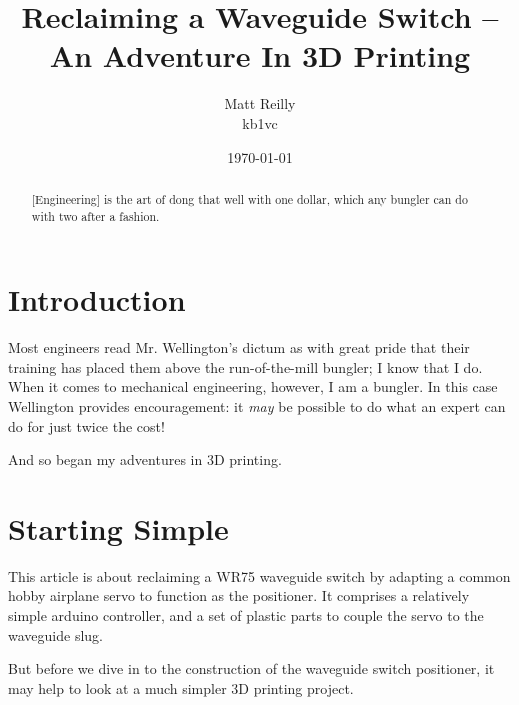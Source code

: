 \documentclass[12pt, twocolumn]{article}
\title{Reclaiming a Waveguide Switch -- An Adventure In 3D Printing}
\author{Matt Reilly  \\
	kb1vc \\
	}
\date{\today}
\begin{document}
\maketitle


\begin{abstract}
  [Engineering] is the art of dong that well with one dollar,
  which any bungler can do with two after a fashion.

\end{abstract}




\section{Introduction}

Most engineers read Mr. Wellington's dictum as with great pride
that their training has placed them above the run-of-the-mill bungler;
I know that I do.
When it comes to mechanical engineering, however, I am a bungler.
In this case Wellington provides encouragement: it {\em may} be possible
to do what an expert can do for just twice the cost!

And so began my adventures in 3D printing.

\section{Starting Simple}

This article is about reclaiming a WR75 waveguide switch by adapting
a common hobby airplane servo to function as the positioner. It comprises
a relatively simple arduino controller, and a set of plastic parts to
couple the servo to the waveguide slug.

But before we dive in to the construction of the waveguide switch positioner,
it may help to look at a much simpler 3D printing project.
\end{document}
